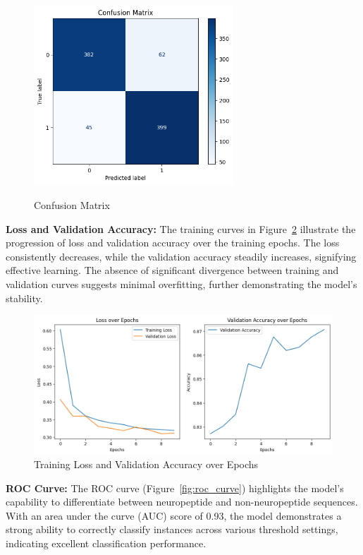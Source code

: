 \documentclass[conference]{IEEEtran}
\begin{document}
\vspace{-.6em}
\begin{figure}[h]
    \centering
    \includegraphics[width=7.5cm, height =7.5cm]{Images/6.png}
    \vspace{-.6em}
    \caption{Confusion Matrix}
    \label{fig:confusion_matrix}
\end{figure}

\textbf{Loss and Validation Accuracy:} The training curves in Figure~\ref{fig:training_curves} illustrate the progression of loss and validation accuracy over the training epochs. The loss consistently decreases, while the validation accuracy steadily increases, signifying effective learning. The absence of significant divergence between training and validation curves suggests minimal overfitting, further demonstrating the model's stability.
\vspace{-.6em}
\begin{figure}[h]
\centering
\includegraphics[width=0.9\linewidth]{Images/7.png}
\vspace{-.3em}
\caption{Training Loss and Validation Accuracy over Epochs}
\label{fig:training_curves}
\end{figure}

\textbf{ROC Curve:} The ROC curve (Figure~\ref{fig:roc_curve}) highlights the model's capability to differentiate between neuropeptide and non-neuropeptide sequences. With an area under the curve (AUC) score of 0.93, the model demonstrates a strong ability to correctly classify instances across various threshold settings, indicating excellent classification performance.
\end{document}
